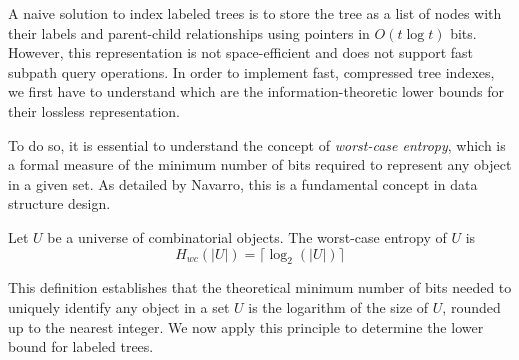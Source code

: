 A naive solution to index labeled trees is to store the tree as a list of nodes with their labels and parent-child relationships using pointers in $O(t \log t)$ bits. However, this representation is not space-efficient and does not support fast subpath query operations.
In order to implement fast, compressed tree indexes, we first have to understand which are the information-theoretic lower bounds for their lossless representation.
\begin{comment}
    \section{Succinct Data Structures for Trees}
    \alessio{Questa sezione non è ben collegata al resto. Serve questa parentesi sulle SDS? Dato che anche prima parli di minimizzare lo spazio e time optimality, potresti parlare direttamente dei lower bound. Il filo logico sarebbe: "vogliamo fare le cose il meglio possibile, ma quanto vale il meglio?"}
    In order to compress the index of labeled trees, we need to avoid the use of pointers and store the tree in a space-efficient manner. Succinct data structures are a class of compressed data structures that support efficient navigation and query operations on the compressed data. These structures are designed to use close to the information-theoretic lower bound on space while providing fast access to the original data. They were first introduced by Jacobson \cite{jacobson1989space} and have been applied to various problems in string processing, graph theory, and data compression.
\end{comment}
To do so, it is essential to understand the concept of \emph{worst-case entropy}, which is a formal measure of the minimum number of bits required to represent any object in a given set.
As detailed by Navarro\cite{navarro2016compact}, this is a fundamental concept in data structure design.

\begin{definition}
Let $U$ be a universe of combinatorial objects. The worst-case entropy of $U$ is 
$$ H_{wc}(|U|) = \lceil\log_2(|U|)\rceil $$
\end{definition}

This definition establishes that the theoretical minimum number of bits needed to uniquely identify any object in a set $U$ is the logarithm of the size of $U$, rounded up to the nearest integer. We now apply this principle to determine the lower bound for labeled trees.

